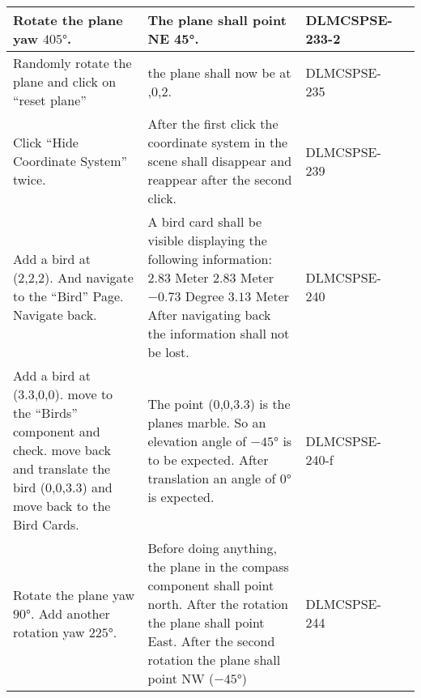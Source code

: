 \begin{xltabular}{\textwidth}{|X|X|M{2cm}|M{2cm}|}
  Rotate the plane yaw $405°$. & The plane shall point NE 45°. & {\color{purpleT}\ttfamily DLMCSPSE-233-2} &  \\ \hline 
  Randomly rotate the plane and click on \enquote{reset plane} & the plane shall now be at {,0,2}. & {\color{purpleT}\ttfamily DLMCSPSE-235} &  \\ \hline 
  Click \enquote{Hide Coordinate System} twice. & After the first click the coordinate system in the scene shall disappear and reappear after the second click. & {\color{purpleT}\ttfamily DLMCSPSE-239} &  \\ \hline 
  Add a bird at {\ttfamily (2,2,2)}. And navigate to the \enquote{Bird} Page. \newline Navigate back. & A bird card shall be visible displaying the following information: \newline $2.83$ Meter \newline $2.83$ Meter \newline $-0.73$ Degree \newline $3.13$ Meter \newline After navigating back the information shall not be lost. & {\color{purpleT}\ttfamily DLMCSPSE-240} &  \\ \hline 
  Add a bird at {\ttfamily(3.3,0,0)}. \newline move to the \enquote{Birds} component and check. \newline move back and translate the bird {\ttfamily(0,0,3.3)} and move back to the Bird Cards. \newline & The point {\ttfamily(0,0,3.3)} is the planes marble. So an elevation angle of $-45°$ is to be expected. \newline After translation an angle of $0°$ is expected. & {\color{purpleT}\ttfamily DLMCSPSE-240-f} &  \\ \hline 
  Rotate the plane yaw $90°$. \newline Add another rotation yaw $225°$. & Before doing anything, the plane in the compass component shall point north. \newline After the rotation the plane shall point East. After the second rotation the plane shall point NW ($-45°$) & {\color{purpleT}\ttfamily DLMCSPSE-244} &  \\ \hline 

\end{xltabular}
